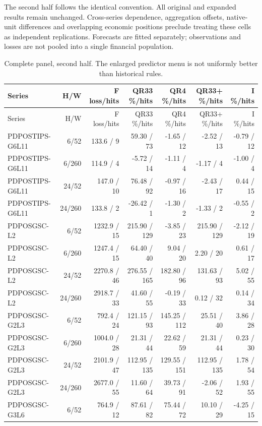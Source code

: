 \documentclass[11pt,a4paper]{article}
\begin{document}
The second half follows the identical convention. All original
and expanded results remain unchanged. Cross-series dependence, aggregation
offsets, native-unit differences and overlapping economic positions preclude
treating these cells as independent replications. Forecasts are fitted
separately; observations and losses are not pooled into a single financial
population.\begingroup
\scriptsize
\setlength{\tabcolsep}{3pt}
\renewcommand{\arraystretch}{1.12}
\begin{longtable}{p{26mm}rrrrrr}
\caption{Complete panel, second half. The enlarged predictor menu is not uniformly better than historical rules.}\\
\toprule
Series & H/W & F loss/hits & QR33 \%/hits & QR4 \%/hits & QR33+ \%/hits & I \%/hits \\
\midrule
\endfirsthead
\toprule
Series & H/W & F loss/hits & QR33 \%/hits & QR4 \%/hits & QR33+ \%/hits & I \%/hits \\
\midrule
\endhead
\bottomrule
\endfoot
PDPOSTIPS-G6L11 & 6/52 & 133.6 / 9 & 59.30 / 73 & -1.65 / 12 & -2.52 / 13 & -0.79 / 12 \\
PDPOSTIPS-G6L11 & 6/260 & 114.9 / 4 & -5.72 / 14 & -1.11 / 4 & -1.17 / 4 & -1.00 / 4 \\
PDPOSTIPS-G6L11 & 24/52 & 147.0 / 10 & 76.48 / 92 & -0.97 / 16 & -2.43 / 17 & 0.44 / 15 \\
PDPOSTIPS-G6L11 & 24/260 & 133.8 / 2 & -26.42 / 1 & -1.30 / 2 & -1.33 / 2 & -0.55 / 2 \\
PDPOSGSC-L2 & 6/52 & 1232.9 / 15 & 215.90 / 129 & -3.85 / 23 & 215.90 / 129 & -2.12 / 19 \\
PDPOSGSC-L2 & 6/260 & 1247.4 / 15 & 64.40 / 40 & 9.04 / 20 & 2.20 / 20 & 0.61 / 17 \\
PDPOSGSC-L2 & 24/52 & 2270.8 / 46 & 276.55 / 165 & 182.80 / 96 & 131.63 / 93 & 5.02 / 55 \\
PDPOSGSC-L2 & 24/260 & 2918.7 / 33 & 41.60 / 55 & -0.19 / 33 & 0.12 / 32 & 0.14 / 34 \\
PDPOSGSC-G2L3 & 6/52 & 792.4 / 24 & 121.15 / 93 & 145.25 / 112 & 25.51 / 40 & 3.86 / 28 \\
PDPOSGSC-G2L3 & 6/260 & 1004.0 / 28 & 21.31 / 44 & 22.62 / 59 & 21.31 / 44 & 0.23 / 30 \\
PDPOSGSC-G2L3 & 24/52 & 2101.9 / 47 & 112.95 / 135 & 129.55 / 151 & 112.95 / 135 & 1.78 / 54 \\
PDPOSGSC-G2L3 & 24/260 & 2677.0 / 55 & 11.60 / 64 & 39.73 / 91 & -2.06 / 52 & 1.93 / 55 \\
PDPOSGSC-G3L6 & 6/52 & 764.9 / 12 & 87.61 / 82 & 75.44 / 72 & 10.10 / 29 & -4.25 / 15 \\

\end{longtable}
\end{document}
